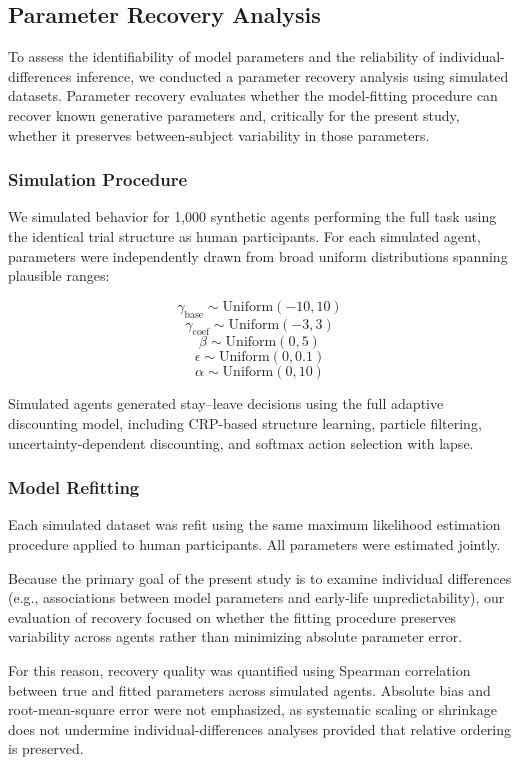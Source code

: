 \documentclass[12pt]{article}
\begin{document}
\subsection*{Parameter Recovery Analysis}

To assess the identifiability of model parameters and the reliability of individual-differences inference, we conducted a parameter recovery analysis using simulated datasets. Parameter recovery evaluates whether the model-fitting procedure can recover known generative parameters and, critically for the present study, whether it preserves between-subject variability in those parameters.

\subsubsection*{Simulation Procedure}

We simulated behavior for 1,000 synthetic agents performing the full task using the identical trial structure as human participants. For each simulated agent, parameters were independently drawn from broad uniform distributions spanning plausible ranges:

\[
\gamma_{\text{base}} \sim \text{Uniform}(-10, 10)
\]
\[
\gamma_{\text{coef}} \sim \text{Uniform}(-3, 3)
\]
\[
\beta \sim \text{Uniform}(0, 5)
\]
\[
\epsilon \sim \text{Uniform}(0, 0.1)
\]
\[
\alpha \sim \text{Uniform}(0, 10)
\]

Simulated agents generated stay–leave decisions using the full adaptive discounting model, including CRP-based structure learning, particle filtering, uncertainty-dependent discounting, and softmax action selection with lapse.

\subsubsection*{Model Refitting}

Each simulated dataset was refit using the same maximum likelihood estimation procedure applied to human participants. All parameters were estimated jointly.

Because the primary goal of the present study is to examine individual differences (e.g., associations between model parameters and early-life unpredictability), our evaluation of recovery focused on whether the fitting procedure preserves variability across agents rather than minimizing absolute parameter error. 

For this reason, recovery quality was quantified using Spearman correlation between true and fitted parameters across simulated agents. Absolute bias and root-mean-square error were not emphasized, as systematic scaling or shrinkage does not undermine individual-differences analyses provided that relative ordering is preserved.
\end{document}

